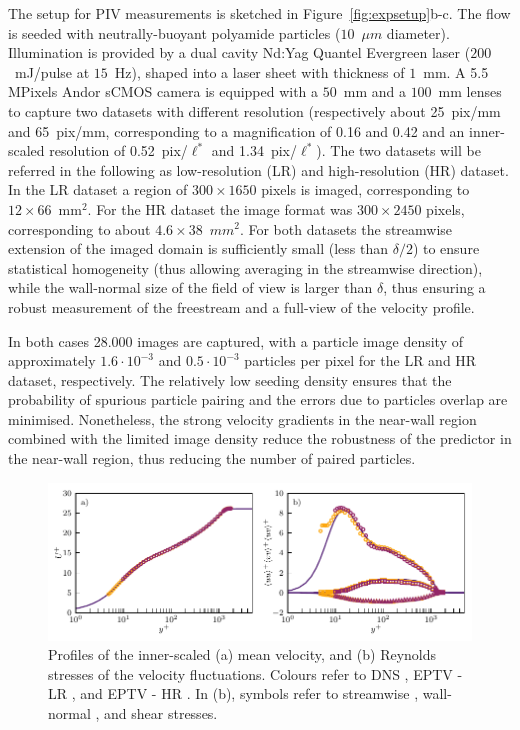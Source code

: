 The setup for PIV measurements is sketched in Figure~\ref{fig:expsetup}b-c. The flow is seeded with neutrally-buoyant polyamide particles ($10$~$\mu m$ diameter). Illumination is provided by a dual cavity Nd:Yag Quantel Evergreen laser ($200$~mJ/pulse at $15$~Hz), shaped into a laser sheet with thickness of $1$~mm. A 5.5 MPixels Andor sCMOS camera is equipped with a $50$~mm and a $100$~mm lenses to capture two datasets with different resolution (respectively about 25~pix/mm and 65~pix/mm, corresponding to a magnification of 0.16 and 0.42 and an inner-scaled resolution of 0.52~pix/$\ell^*$ and  1.34~pix/$\ell^*$). The two datasets will be referred in the following as low-resolution (LR) and high-resolution (HR) dataset. In the LR dataset a region of $300 \times 1650$ pixels is imaged, corresponding to $ 12 \times 66$~mm$^2$. For the HR dataset the image format was $300 \times 2450$ pixels, corresponding to about $ 4.6 \times 38$~$mm^2$. For both datasets the streamwise extension of the imaged domain is sufficiently small (less than $\delta/2$) to ensure statistical homogeneity (thus allowing averaging in the streamwise direction), while the wall-normal size of the field of view is larger than $\delta$, thus ensuring a robust measurement of the freestream and a full-view of the velocity profile. 

In both cases 28.000 images are captured, with a particle image density of approximately $1.6\cdot10^{-3}$ and $0.5\cdot10^{-3}$ particles per pixel for the LR and HR dataset, respectively. The relatively low seeding density ensures that the probability of spurious particle pairing and the errors due to particles overlap are minimised. Nonetheless, the strong velocity gradients in the near-wall region combined with the limited image density reduce the robustness of the predictor in the near-wall region, thus reducing the number of paired particles.  

\begin{figure}
    \centering
    \includegraphics[width=\textwidth]{Figures/figure04.pdf}
    \caption{Profiles of the inner-scaled (a) mean velocity, and (b) Reynolds stresses of the velocity fluctuations. Colours refer to DNS , EPTV - LR , and EPTV - HR . In (b), symbols refer to streamwise , wall-normal , and shear  stresses.}
    \label{fig:F2_EPTVvsDNS}
\end{figure}


